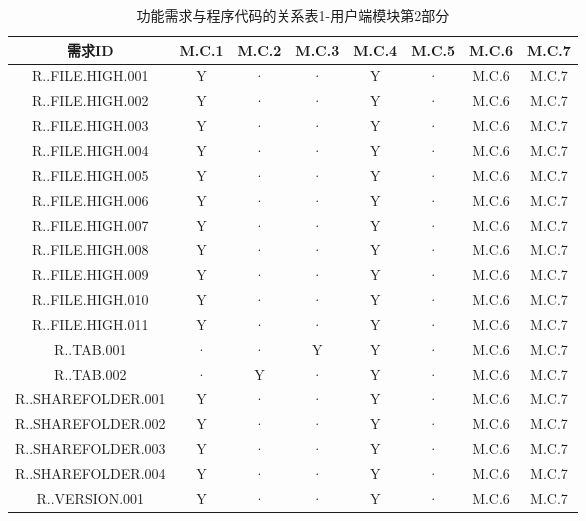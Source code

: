 \begin{table}[htbp]
\centering
\caption{功能需求与程序代码的关系表1-用户端模块第2部分} \label{tab:requirement-module}
\begin{tabular}{|c|c|c|c|c|c||c|c|}
    \hline 
    需求ID & M.C.1 & M.C.2 & M.C.3 & M.C.4 & M.C.5 &M.C.6 & M.C.7\\
    \hline  
    R..FILE.HIGH.001 & Y  &·  & · &Y  &· &M.C.6 & M.C.7\\
    \hline
    R..FILE.HIGH.002 & Y  &·  & · & Y  &· &M.C.6 & M.C.7\\
    \hline
    R..FILE.HIGH.003 & Y &· &· & Y  &· &M.C.6 & M.C.7\\
    \hline
    R..FILE.HIGH.004 & Y &· &· &Y  &· &M.C.6 & M.C.7\\
    \hline 
    R..FILE.HIGH.005 & Y &· &· & Y  &· &M.C.6 & M.C.7\\
    \hline
    R..FILE.HIGH.006 &Y  &· &· &   Y& ·&M.C.6 & M.C.7\\
    \hline
    R..FILE.HIGH.007 &Y  &·  &·  &  Y& ·&M.C.6 & M.C.7\\
    \hline 
    R..FILE.HIGH.008 &Y  &·  &·  &  Y& ·&M.C.6 & M.C.7\\
    \hline
    R..FILE.HIGH.009 &Y  &·  &·  &   Y& ·&M.C.6 & M.C.7\\
    \hline
    R..FILE.HIGH.010 &Y &· &· &   Y& ·&M.C.6 & M.C.7\\
    \hline
    R..FILE.HIGH.011 &Y  &· &· &   Y&  ·&M.C.6 & M.C.7\\
    \hline
    R..TAB.001 &·  &· &Y &   Y&  ·&M.C.6 & M.C.7\\
    \hline 
    R..TAB.002 &·   &Y  &·  &   Y& ·&M.C.6 & M.C.7\\
    \hline
    R..SHAREFOLDER.001 &  Y &·  &·  &  Y& ·&M.C.6 & M.C.7\\
    \hline
    R..SHAREFOLDER.002 &  Y &·  &·  &  Y& ·&M.C.6 & M.C.7\\
    \hline
    R..SHAREFOLDER.003 &  Y &·  &·  &   Y& ·&M.C.6 & M.C.7\\ 
    \hline
    R..SHAREFOLDER.004 &  Y &·  &·  &   Y& ·&M.C.6 & M.C.7\\
    \hline
    R..VERSION.001 &  Y &·  &·  &   Y& ·&M.C.6 & M.C.7\\
    \hline
\end{tabular}
\end{table}
 

